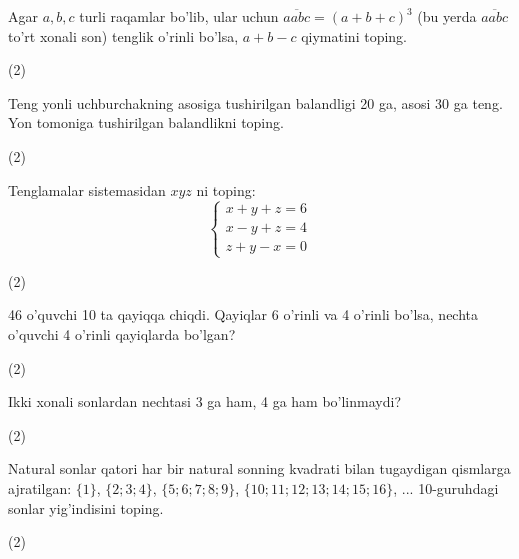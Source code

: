 \documentclass[14pt]{article}
\begin{document}
\begin{taskbox}
Agar $a, b, c$ turli raqamlar bo'lib, ular uchun $\overline{aabc} = (a+b+c)^3$ (bu yerda $\overline{aabc}$ to'rt xonali son) tenglik o'rinli bo'lsa, $a+b-c$ qiymatini toping.
\begin{tasks}(2)
\end{tasks}
\end{taskbox}

\begin{taskbox}
Teng yonli uchburchakning asosiga tushirilgan balandligi 20 ga, asosi 30 ga teng. Yon tomoniga tushirilgan balandlikni toping.
\begin{tasks}(2)
\end{tasks}
\end{taskbox}

\begin{taskbox}
Tenglamalar sistemasidan $xyz$ ni toping:
\[
\begin{cases}
x + y + z = 6\\
x - y + z = 4\\
z + y - x = 0
\end{cases}
\]
\begin{tasks}(2)
\end{tasks}
\end{taskbox}

\begin{taskbox}
46 o'quvchi 10 ta qayiqqa chiqdi. Qayiqlar 6 o'rinli va 4 o'rinli bo'lsa, nechta o'quvchi 4 o'rinli qayiqlarda bo'lgan?
\begin{tasks}(2)
\end{tasks}
\end{taskbox}

\begin{taskbox}
Ikki xonali sonlardan nechtasi 3 ga ham, 4 ga ham bo'linmaydi?
\begin{tasks}(2)
\end{tasks}
\end{taskbox}

\begin{taskbox}
Natural sonlar qatori har bir natural sonning kvadrati bilan tugaydigan qismlarga ajratilgan: $\{1\}$, $\{2;3;4\}$, $\{5;6;7;8;9\}$, $\{10;11;12;13;14;15;16\}$, ... 10-guruhdagi sonlar yig'indisini toping.
\begin{tasks}(2)
\end{tasks}
\end{taskbox}
\end{document}
